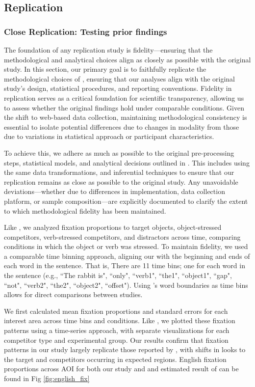 \subsection{Replication}
\subsubsection{Close Replication: Testing prior findings}

The foundation of any replication study is fidelity—ensuring that the methodological and analytical choices align as closely as possible with the original study. In this section, our primary goal is to faithfully replicate the methodological choices of \citep{Ge2021}, ensuring that our analyses align with the original study’s design, statistical procedures, and reporting conventions. Fidelity in replication serves as a critical foundation for scientific transparency, allowing us to assess whether the original findings hold under comparable conditions. Given the shift to web-based data collection, maintaining methodological consistency is essential to isolate potential differences due to changes in modality from those due to variations in statistical approach or participant characteristics.

To achieve this, we adhere as much as possible to the original pre-processing steps, statistical models, and analytical decisions outlined in \citep{Ge2021}. This includes using the same data transformations, and inferential techniques to ensure that our replication remains as close as possible to the original study. Any unavoidable deviations—whether due to differences in implementation, data collection platform, or sample composition—are explicitly documented to clarify the extent to which methodological fidelity has been maintained.

Like \cite{Ge2021}, we analyzed fixation proportions to target objects, object-stressed competitors, verb-stressed competitors, and distractors across time, comparing conditions in which the object or verb was stressed. To maintain fidelity, we used a comparable time binning approach, aligning our with the beginning and ends of each word in the sentence. That is, There are 11 time bins; one for each word in the sentence (e.g., ``The rabbit is", ``only", ``verb1", ``the1", ``object1", ``gap", ``not", ``verb2", ``the2", ``object2", ``offset"). Using \cite{Ge2021}’s word boundaries as time bins allows for direct comparisons between studies.

We first calculated mean fixation proportions and standard errors for each interest area across time bins and conditions. Like \cite{Ge2021}, we plotted these fixation patterns using a time-series approach, with separate visualizations for each competitor type and experimental group. Our results confirm that fixation patterns in our study largely replicate those reported by \cite{Ge2021}, with shifts in looks to the target and competitors occurring in expected regions. English fixation proportions across AOI for both our study and and estimated result of \cite{Ge2021} can be found in Fig \ref{fig:english_fix}

